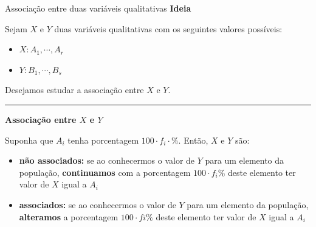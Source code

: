 \documentclass[
  10pt,
  ignorenonframetext,
]{beamer}
\providecommand{\tightlist}{%
  \setlength{\itemsep}{0pt}\setlength{\parskip}{0pt}}\usepackage{longtable,booktabs,array}
\newcommand*{\regrafina}{\rule{\textwidth}{0.5pt}}
\begin{document}
\begin{frame}{Associação entre duas variáveis qualitativas}
\protect\hypertarget{associauxe7uxe3o-entre-duas-variuxe1veis-qualitativas}{}
\textbf{Ideia}

Sejam \(X\) e \(Y\) duas variáveis qualitativas com os seguintes valores
possíveis:

\begin{itemize}
\tightlist
\item
  \(X: A_1, \cdots, A_r\)
\item
  \(Y: B_1, \cdots, B_s\)
\end{itemize}

Desejamos estudar a associação entre \(X\) e \(Y\).

\regrafina

\textbf{Associação entre \(X\) e \(Y\)}

Suponha que \(A_i\) tenha porcentagem \(100 \cdot f_i \cdot \%\). Então,
\(X\) e \(Y\) são:

\begin{itemize}
\tightlist
\item
  \textbf{não associados:} se ao conhecermos o valor de \(Y\) para um
  elemento da população, \textbf{continuamos} com a porcentagem
  \(100 \cdot f_i \%\) deste elemento ter valor de \(X\) igual a \(A_i\)
\item
  \textbf{associados:} se ao conhecermos o valor de \(Y\) para um
  elemento da população, \textbf{alteramos} a porcentagem
  \(100 \cdot fi \%\) deste elemento ter valor de \(X\) igual a \(A_i\)
\end{itemize}
\end{frame}
\end{document}
